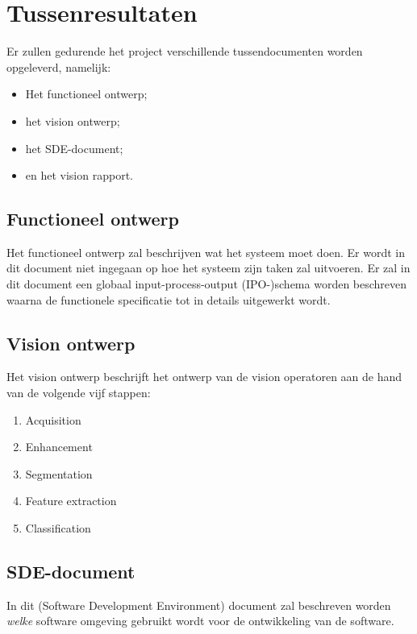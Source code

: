 \chapter{Tussenresultaten}

Er zullen gedurende het project verschillende tussendocumenten worden
opgeleverd, namelijk:

\begin{itemize}
    \item Het functioneel ontwerp;
    \item het vision ontwerp;
    \item het SDE-document;
    \item en het vision rapport.
\end{itemize}

\section{Functioneel ontwerp}

Het functioneel ontwerp zal beschrijven wat het systeem moet doen. Er wordt in
dit document niet ingegaan op hoe het systeem zijn taken zal uitvoeren. Er zal
in dit document een globaal input-process-output (IPO-)schema worden beschreven
waarna de functionele specificatie tot in details uitgewerkt wordt.

\section{Vision ontwerp}


Het vision ontwerp beschrijft het ontwerp van de vision operatoren aan de hand
van de volgende vijf stappen:

\begin{enumerate}
    \item Acquisition
    \item Enhancement
    \item Segmentation
    \item Feature extraction
    \item Classification
\end{enumerate}

\section{SDE-document}

In dit (Software Development Environment) document zal beschreven worden 
\emph{welke} software omgeving gebruikt wordt voor de ontwikkeling van de
software.

